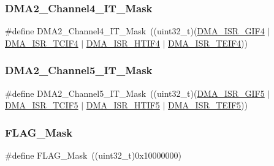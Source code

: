 \subsubsection{\texorpdfstring{DMA2\_Channel4\_IT\_Mask}{DMA2\_Channel4\_IT\_Mask}}
{\footnotesize\ttfamily \#define D\+M\+A2\+\_\+\+Channel4\+\_\+\+I\+T\+\_\+\+Mask~((uint32\+\_\+t)(\mbox{\hyperlink{group___peripheral___registers___bits___definition_gaf4f69823d44810c353af1f0a89eaf180}{D\+M\+A\+\_\+\+I\+S\+R\+\_\+\+G\+I\+F4}} $\vert$ \mbox{\hyperlink{group___peripheral___registers___bits___definition_gad7d4e46949a35cf037a303bd65a0c87a}{D\+M\+A\+\_\+\+I\+S\+R\+\_\+\+T\+C\+I\+F4}} $\vert$ \mbox{\hyperlink{group___peripheral___registers___bits___definition_ga684cf326c770f1ab21c604a5f62907ad}{D\+M\+A\+\_\+\+I\+S\+R\+\_\+\+H\+T\+I\+F4}} $\vert$ \mbox{\hyperlink{group___peripheral___registers___bits___definition_ga12fcc1471918f3e7b293b2d825177253}{D\+M\+A\+\_\+\+I\+S\+R\+\_\+\+T\+E\+I\+F4}}))}

\mbox{\label{group___d_m_a___private___defines_gaedaf3e94d362754266807d6ccbab2e3e}} 
\subsubsection{\texorpdfstring{DMA2\_Channel5\_IT\_Mask}{DMA2\_Channel5\_IT\_Mask}}
{\footnotesize\ttfamily \#define D\+M\+A2\+\_\+\+Channel5\+\_\+\+I\+T\+\_\+\+Mask~((uint32\+\_\+t)(\mbox{\hyperlink{group___peripheral___registers___bits___definition_ga83d4d9cba635d1e33e3477b773379cfd}{D\+M\+A\+\_\+\+I\+S\+R\+\_\+\+G\+I\+F5}} $\vert$ \mbox{\hyperlink{group___peripheral___registers___bits___definition_ga5ea57d09f13edbd6ad8afe9465e0fa70}{D\+M\+A\+\_\+\+I\+S\+R\+\_\+\+T\+C\+I\+F5}} $\vert$ \mbox{\hyperlink{group___peripheral___registers___bits___definition_ga3d1f2b8c82b1e20b4311af8ca9576736}{D\+M\+A\+\_\+\+I\+S\+R\+\_\+\+H\+T\+I\+F5}} $\vert$ \mbox{\hyperlink{group___peripheral___registers___bits___definition_ga42f9b12c4c80cbb7cd0f94f139c73de3}{D\+M\+A\+\_\+\+I\+S\+R\+\_\+\+T\+E\+I\+F5}}))}

\mbox{\label{group___d_m_a___private___defines_ga2be62bf481cd44de9ab604efe5595ff6}} 
\subsubsection{\texorpdfstring{FLAG\_Mask}{FLAG\_Mask}}
{\footnotesize\ttfamily \#define F\+L\+A\+G\+\_\+\+Mask~((uint32\+\_\+t)0x10000000)}

